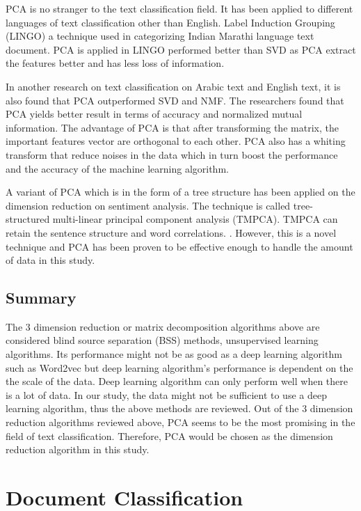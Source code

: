 PCA is no stranger to the text classification field. It has been applied to different languages of text classification other than English. Label Induction Grouping (LINGO) a technique used in categorizing Indian Marathi language text document. PCA is applied in LINGO performed better than SVD as PCA extract the features better and has less loss of information. \cite{lingo}
	
In another research on text classification on Arabic text and English text, it is also found that PCA outperformed SVD and NMF. The researchers found that PCA yields better result in terms of accuracy and normalized mutual information. The advantage of PCA is that after transforming the matrix, the important features vector are orthogonal to each other. PCA also has a whiting transform that reduce noises in the data which in turn boost the performance and the accuracy of the machine learning algorithm.\cite{dimReducArabic}
	
A variant of PCA which is in the form of a tree structure has been applied on the dimension reduction on sentiment analysis. The technique is called tree-structured multi-linear principal component analysis (TMPCA). TMPCA can retain the sentence structure and word correlations. \cite{treePca}. However, this is a novel technique and PCA has been proven to be effective enough to handle the amount of data in this study.
	
\subsection{Summary}
The 3 dimension reduction or matrix decomposition algorithms above are considered blind source separation (BSS) methods, unsupervised learning algorithms. Its performance might not be as good as a deep learning algorithm such as Word2vec but deep learning algorithm's performance is dependent on the the scale of the data. Deep learning algorithm can only perform well when there is a lot of data. In our study, the data might not be sufficient to use a deep learning algorithm, thus the above methods are reviewed. Out of the 3 dimension reduction algorithms reviewed above, PCA seems to be the most promising in the field of text classification. Therefore, PCA would be chosen as the dimension reduction algorithm in this study.
	
\section{Document Classification}
